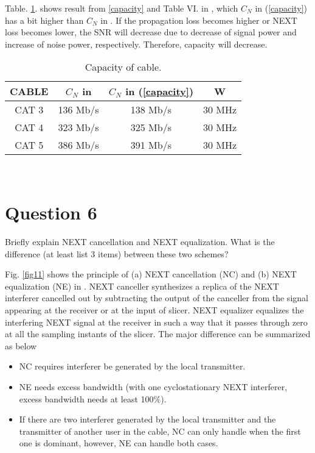 \documentclass[journal]{IEEEtran}
\begin{document}
Table. \ref{tab3}. shows result from \ref{capacity} and Table VI. in \cite{REF1}, which $C_N$ in (\ref{capacity}) has a bit higher than $C_N$ in \cite{REF1}.
If the propagation loss becomes higher or NEXT loss becomes lower,
the SNR will decrease due to decrease of signal power and increase of noise power, respectively.
Therefore, capacity will decrease.

\begin{table}[!htbp]
\centering
\caption{Capacity of cable.} 
\begin{tabular}{| c | c | c | c |}
\hline	
CABLE & $C_N$ in \cite{REF1} & $C_N$ in (\ref{capacity})& W \\
\hline
CAT 3 & 136 Mb/s & 138 Mb/s & 30 MHz \\
\hline
CAT 4 & 323 Mb/s & 325 Mb/s & 30 MHz \\
\hline
CAT 5 & 386 Mb/s & 391 Mb/s & 30 MHz \\
\hline
\end{tabular}
\\
\label{tab3}
\end{table}

\section{Question 6}
Briefly explain NEXT cancellation and NEXT equalization. What is the difference (at least list 3 items) between these two schemes?

Fig. \ref{fig11} shows the principle of (a) NEXT cancellation (NC) and (b) NEXT equalization (NE) in \cite{REF1}.
NEXT canceller synthesizes a replica of the NEXT interferer cancelled out by subtracting the output of the canceller from the signal appearing at the receiver or at the input of slicer.
NEXT equalizer equalizes the interfering NEXT signal at the receiver in such a way that it passes through zero at all the sampling instants of the slicer.
The major difference can be summarized as below
\begin{itemize}
\item NC requires interferer be generated by the local transmitter.
\item NE needs excess bandwidth (with one cyclostationary NEXT interferer, excess bandwidth needs at least 100$\%$).
\item If there are two interferer generated by the local transmitter and the transmitter of another user in the cable, NC can only handle when the first one is dominant, however, NE can handle both cases. 
\end{itemize}
\end{document}

